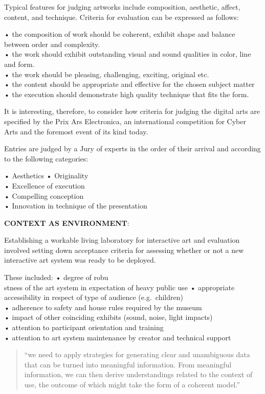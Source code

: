 Typical features for judging artworks include composition, aesthetic, affect, content, and technique. Criteria for evaluation can be expressed as follows:

•	the composition of work should be coherent, exhibit shape and balance between order and complexity.\\
•	the work should exhibit outstanding visual and sound qualities in color, line and form.\\
•	the work should be pleasing, challenging, exciting, original etc.\\
•	the content should be appropriate and effective for the chosen subject matter\\
•	the execution should demonstrate high quality technique that fits the form.

It is interesting, therefore, to consider how criteria for judging the digital arts are specified by the Prix Ars Electronica, an international competition for Cyber Arts and the foremost event of its kind today.

Entries are judged by a Jury of experts in the order of their arrival and according to the following categories:

•	Aesthetics • Originality\\
•	Excellence of execution\\
•	Compelling conception\\
•	Innovation in technique of the presentation

\textbf{CONTEXT AS ENVIRONMENT}: \parencite[p.21]{Candy2012}

Establishing a workable living laboratory for interactive art and evaluation involved setting down acceptance criteria for assessing whether or not a new interactive art system was ready to be deployed.

These included:
•	degree of robu\\stness of the art system in expectation of heavy public use
•	appropriate accessibility in respect of type of audience (e.g.\ children)\\
•	adherence to safety and house rules required by the museum\\
•	impact of other coinciding exhibits (sound, noise, light impacts)\\
•	attention to participant orientation and training\\
•	attention to art system maintenance by creator and technical support

\begin{quote}
  ``we need to apply strategies for generating clear and unambiguous data that can be turned into meaningful information. From meaningful information, we can then derive understandings related to the context of use, the outcome of which might take the form of a coherent model.'' \parencite[p.21]{Candy2012}
\end{quote}


